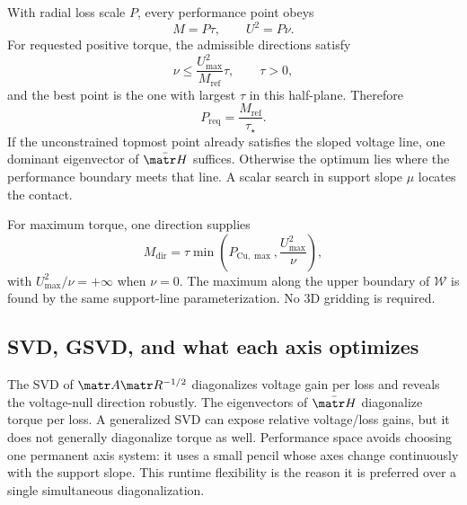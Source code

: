 With radial loss scale \(P\), every performance point obeys
\begin{equation}
 M=P\tau,\qquad U^2=P\nu.
\end{equation}
For requested positive torque, the admissible directions satisfy
\begin{equation}
 \nu\leq\frac{U_{\max}^2}{M_{\mathrm{ref}}}\tau,\qquad \tau>0,
 \label{eq:performance-wedge}
\end{equation}
and the best point is the one with largest \(\tau\) in this half-plane.
Therefore
\begin{equation}
 \boxed{P_{\mathrm{req}}=\frac{M_{\mathrm{ref}}}{\tau_\star}.}
 \label{eq:performance-preq}
\end{equation}
If the unconstrained topmost point already satisfies the sloped voltage line,
one dominant eigenvector of \(\bar{\matr H}\) suffices. Otherwise the optimum
lies where the performance boundary meets that line. A scalar search in
support slope \(\mu\) locates the contact.

For maximum torque, one direction supplies
\begin{equation}
 M_{\mathrm{dir}}=\tau\min\!\left(P_{\mathrm{Cu},\max},
 \frac{U_{\max}^2}{\nu}\right),
 \label{eq:performance-mmax}
\end{equation}
with \(U_{\max}^2/\nu=+\infty\) when \(\nu=0\). The maximum along the upper
boundary of \(\mathcal W\) is found by the same support-line parameterization.
No 3D gridding is required.

\subsection{SVD, GSVD, and what each axis optimizes}

The SVD of \(\matr A\matr R^{-1/2}\) diagonalizes voltage gain per loss and
reveals the voltage-null direction robustly. The eigenvectors of
\(\bar{\matr H}\) diagonalize torque per loss. A generalized SVD can expose
relative voltage/loss gains, but it does not generally diagonalize torque as
well. Performance space avoids choosing one permanent axis system: it uses a
small pencil whose axes change continuously with the support slope. This
runtime flexibility is the reason it is preferred over a single simultaneous
diagonalization.
